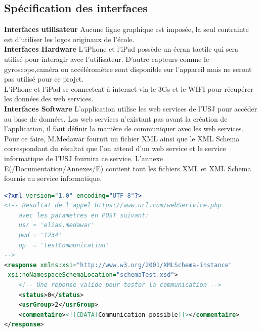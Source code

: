 	\subsection{Spécification des interfaces}
		\textbf{Interfaces utilisateur}  
			Aucune ligne graphique est imposée, la seul contrainte est d'utiliser les logos originaux de l'école.\\[0.2cm]
		\textbf{Interfaces Hardware} 
			L'iPhone et l'iPad possède un écran tactile qui sera utilisé pour interagir avec l'utilisateur. D'autre capteurs comme le gyroscope,caméra ou accéléromètre sont disponible sur l'appareil mais ne seront pas utilisé pour ce projet. \\
			L'iPhone et l'iPad se connectent à internet via le 3Gs et le WIFI pour récupérer les données des web services.\\[0.2cm]
	 	\textbf{Interfaces Software} 
			L'application utilise les web services de l'\gls{USJ} pour accéder au base de données. Les web services n'existant pas avant la création de l'application, il faut définir la manière de communiquer avec les web services. Pour ce faire, M.Medawar fournit un fichier XML ainsi que le XML Schema correspondant du résultat que l'on attend d'un web service et le service informatique de l'USJ fournira ce service.  L'annexe E(/Documentation/Annexes/E) contient tout les fichiers XML et XML Schema fournis au service informatique. \\

			  \begin{lstlisting}[language=XML,caption = Exemple de code XML fournit au service informatique de l'USJ]
<?xml version="1.0" encoding="UTF-8"?>
<!-- Resultat de l'appel https://www.url.com/webSerivice.php 
    avec les parametres en POST suivant:
    usr = 'elias.medawar'
    pwd = '1234'
    op  = 'testCommunication'
-->
<response xmlns:xsi="http://www.w3.org/2001/XMLSchema-instance"
 xsi:noNamespaceSchemaLocation="schemaTest.xsd">
    <!-- Une reponse valide pour tester la communication -->
    <status>0</status>
    <usrGroup>2</usrGroup>
    <commentaire><![CDATA[Communication possible]]></commentaire>
</response>
			\end{lstlisting}

